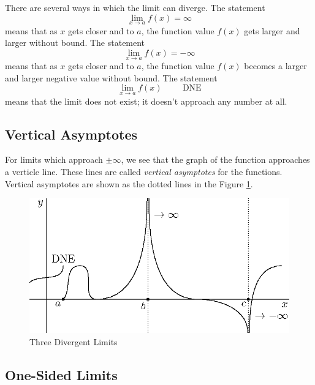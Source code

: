 \documentclass[fleqn]{report}
\begin{document}
There are several ways in which the limit can diverge. The
statement
\begin{equation*}
\lim_{x \rightarrow a} f(x) = \infty
\end{equation*}
means that as $x$ gets closer and to $a$, the function value
$f(x)$ gets larger and larger without bound. The statement
\begin{equation*}
\lim_{x \rightarrow a} f(x) = -\infty
\end{equation*}
means that as $x$ gets closer and to $a$, the function value
$f(x)$ becomes a larger and larger negative value without
bound. The statement
\begin{equation*}
\lim_{x \rightarrow a} f(x) \hspace{1cm} \text{DNE}
\end{equation*}
means that the limit does not exist; it doesn't approach any
number at all.

\subsection{Vertical Asymptotes}
\label{vertical-asymptotes}

For limits which approach $\pm \infty$, we see that the graph
of the function approaches a verticle line.  These lines are
called \emph{vertical asymptotes} for the functions.  Vertical
asymptotes are shown as the dotted lines in the Figure
\ref{figure-three-divergent-limits}.

\begin{figure}[ht]
\centering
\includegraphics{figure19.eps}
\caption{Three Divergent Limits}
\label{figure-three-divergent-limits}
\end{figure}

\subsection{One-Sided Limits}
\label{one-sided}
\end{document}
